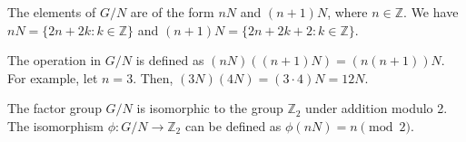 \begin{enumerate}
\begin{enumerate}
    The elements of $G/N$ are of the form $nN$ and $(n+1)N$, where $n \in \mathbb{Z}$. We have $nN = \{2n + 2k : k \in \mathbb{Z}\}$ and $(n+1)N = \{2n + 2k + 2 : k \in \mathbb{Z}\}$.

    The operation in $G/N$ is defined as $(nN)((n+1)N) = (n(n+1))N$. For example, let $n = 3$. Then, $(3N)(4N) = (3\cdot 4)N = 12N$.

    The factor group $G/N$ is isomorphic to the group $\mathbb{Z}_2$ under addition modulo 2. The isomorphism $\phi : G/N \to \mathbb{Z}_2$ can be defined as $\phi(nN) = n \pmod 2$.
  \end{enumerate}
\end{enumerate}




